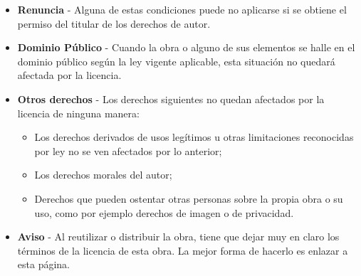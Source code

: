 \begin{itemize}
\item
  \textbf{Renuncia} - Alguna de estas condiciones puede no aplicarse si
  se obtiene el permiso del titular de los derechos de autor.
\item
  \textbf{Dominio Público} - Cuando la obra o alguno de sus elementos se
  halle en el dominio público según la ley vigente aplicable, esta
  situación no quedará afectada por la licencia.
\item
  \textbf{Otros derechos} - Los derechos siguientes no quedan afectados
  por la licencia de ninguna manera:

  \begin{itemize}
  \item
    Los derechos derivados de usos legítimos u otras limitaciones
    reconocidas por ley no se ven afectados por lo anterior;
  \item
    Los derechos morales del autor;
  \item
    Derechos que pueden ostentar otras personas sobre la propia obra o
    su uso, como por ejemplo derechos de imagen o de privacidad.
  \end{itemize}
\item
  \textbf{Aviso} - Al reutilizar o distribuir la obra, tiene que dejar
  muy en claro los términos de la licencia de esta obra. La mejor forma
  de hacerlo es enlazar a esta página.
\end{itemize}

